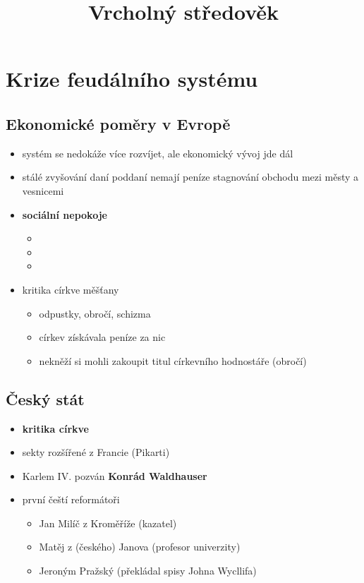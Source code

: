 \title{Vrcholný středověk}




\section{Krize feudálního systému}
\subsection{Ekonomické poměry v Evropě}
\begin{itemize}
\item systém se nedokáže více rozvíjet, ale ekonomický vývoj jde dál
\item stálé zvyšování daní \ra poddaní nemají peníze \ra stagnování obchodu mezi městy a vesnicemi
\item[\ra] \textbf{sociální nepokoje}
	\begin{itemize}
	\item {}
	\item {}
	\item {}
	\end{itemize}
\item kritika církve měšťany
	\begin{itemize}
	\item odpustky, obročí, schizma
	\item církev získávala peníze za nic
	\item nekněží si mohli zakoupit titul církevního hodnostáře (obročí)
	\end{itemize}
\end{itemize}

\subsection{Český stát}
\begin{itemize}
\item \textbf{kritika církve}
\item sekty rozšířené z Francie (Pikarti)
\item Karlem IV. pozván \textbf{Konrád Waldhauser}
\item první čeští reformátoři
	\begin{itemize}
	\item Jan Milíč z Kroměříže (kazatel)
	\item Matěj z (českého) Janova (profesor univerzity)
	\item Jeroným Pražský (překládal spisy Johna Wycllifa)
	\end{itemize}
\end{itemize}

